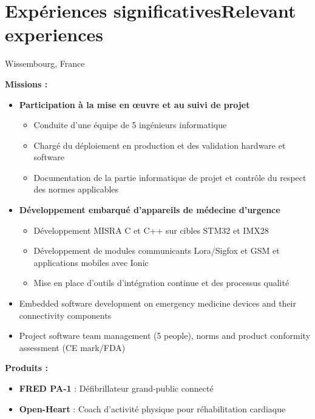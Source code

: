 \section{\ifnativelang Exp\'eriences significatives\else Relevant experiences\fi}

{}{}{Wissembourg, France}{
\textcolor{color1}{\textbf{Missions :}}
\begin{itemize}
\ifnativelang
\item \textbf{Participation \`a la mise en \oe uvre et au suivi de projet}
\begin{itemize}
\item Conduite d’une équipe de 5 ingénieurs informatique
\item Chargé du déploiement en production et des validation hardware et software
\item Documentation de la partie informatique de projet et contrôle du respect des normes applicables
\end{itemize}
\item \textbf{Développement embarqué d'appareils de médecine d’urgence}
\begin{itemize}
\item D\'eveloppement MISRA C et C++ sur cibles STM32 et IMX28
\item D\'eveloppement de modules communicants Lora/Sigfox et GSM et applications mobiles avec Ionic
\item Mise en place d'outils d'intégration continue et des processus qualit\'e
\end{itemize}
\else
\item Embedded software development on emergency medicine devices and their connectivity components
\item Project software team management (5 people),  norms and product conformity assessment (CE mark/FDA)
\fi
\end{itemize}
\textcolor{color1}{\textbf{Produits :}}
\begin{itemize}
\item \textbf{FRED PA-1} : Défibrillateur grand-public connecté \textcolor{color1}{\href{http://www.schiller.ch/fr/fr/product/fred-pa-1}{\ExternalLink}}
\item \textbf{Open-Heart} : Coach d'activit\'e physique pour r\'ehabilitation cardiaque  \textcolor{color1}{\href{http://www.schiller.ch/fr/fr/schiller-\%C3\%A0-la-fine-pointe-de-la-sant\%C3\%A9-connect\%C3\%A9e}{\ExternalLink}}
\end{itemize}
}



